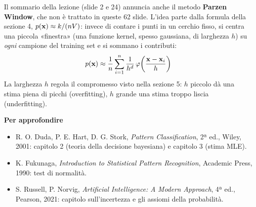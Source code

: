 \vspace{10pt}
\begin{tcolorbox}[base,colback=ambra!7,colbacktitle=ambra,coltitle=white,borderline west={3pt}{0pt}{ambra},title={Anteprima: approccio non parametrico (Parzen Window)},top=13pt]
Il sommario della lezione (slide 2 e 24) annuncia anche il metodo \textbf{Parzen Window}, che non è trattato in queste 62 slide. L'idea parte dalla formula della sezione 4, $p(\mathbf{x})\approx k/(nV)$: invece di contare i punti in un cerchio fisso, si centra una piccola «finestra» (una funzione kernel, spesso gaussiana, di larghezza $h$) su \emph{ogni} campione del training set e si sommano i contributi:
\[
p(\mathbf{x})\approx\frac1n\sum_{i=1}^{n}\frac{1}{h^d}\,\varphi\!\left(\frac{\mathbf{x}-\mathbf{x}_i}{h}\right)
\]
La larghezza $h$ regola il compromesso visto nella sezione 5: $h$ piccolo dà una stima piena di picchi (overfitting), $h$ grande una stima troppo liscia (underfitting).
\end{tcolorbox}

\vspace{4pt}
{\headfont\bfseries\color{navy}Per approfondire}
\begin{itemize}
  \item R. O. Duda, P. E. Hart, D. G. Stork, \emph{Pattern Classification}, 2ª ed., Wiley, 2001: capitolo 2 (teoria della decisione bayesiana) e capitolo 3 (stima MLE).
  \item K. Fukunaga, \emph{Introduction to Statistical Pattern Recognition}, Academic Press, 1990: test di normalità.
  \item S. Russell, P. Norvig, \emph{Artificial Intelligence: A Modern Approach}, 4ª ed., Pearson, 2021: capitolo sull'incertezza e gli assiomi della probabilità.
\end{itemize}
